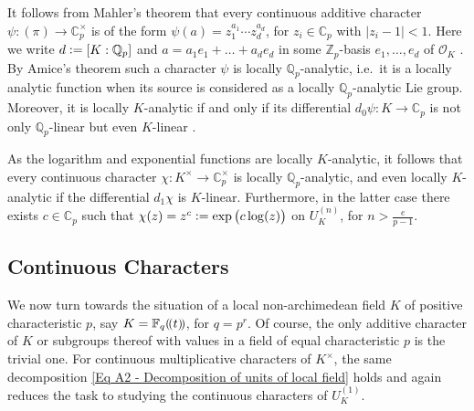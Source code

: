 \documentclass[a4paper, reqno, 10pt]{amsart}
\theoremstyle{definition}
\numberwithin{equation}{section}
\newcommand{\abs}[1]{{\lvert{#1}\rvert}}
\newcommand{\defeq}{\vcentcolon=}
\newcommand{\ra}{\rightarrow}
\newcommand{\unts}{^{\times}}
\newcommand{\llrrparen}[1]{\mkern-3mu\left(\mkern-3mu\left(#1\right)\mkern-3mu\right)}
\newcommand{\BC}{{\mathbb {C}}}
\newcommand{\BF}{{\mathbb {F}}}
\newcommand{\BQ}{{\mathbb {Q}}}
\newcommand{\BZ}{{\mathbb {Z}}}
\newcommand{\CO}{{\mathcal {O}}}
\newcommand{\unif}{{\pi}}
\begin{document}
It follows from Mahler's theorem \cite[Thm.\ 13.1]{SchneiderTeitelbaum04ContLocAnRepThLectHangzhou} that every continuous additive character $\psi \colon (\unif) \ra \BC_p\unts$ is of the form $\psi(a) = z_1^{a_1} \cdots z_d^{a_d}$, for $z_i \in \BC_p$ with $\abs{z_i-1}<1$. 
Here we write $d\defeq[K:\BQ_p]$ and $a=a_1 e_1 +\ldots + a_d e_d$ in some $\BZ_p$-basis $e_1,\ldots,e_d$ of $\CO_K$ \cite[Example 16.2]{SchneiderTeitelbaum04ContLocAnRepThLectHangzhou}.
By Amice's theorem \cite[Thm.\ 13.2]{SchneiderTeitelbaum04ContLocAnRepThLectHangzhou} such a character $\psi$ is locally $\BQ_p$-analytic, i.e.\ it is a locally analytic function when its source is considered as a locally $\BQ_p$-analytic Lie group.
Moreover, it is locally $K$-analytic if and only if its differential $d_0\psi \colon K \ra \BC_p$ is not only $\BQ_p$-linear but even $K$-linear \cite[Prop.\ 16.3]{SchneiderTeitelbaum04ContLocAnRepThLectHangzhou}.

As the logarithm and exponential functions are locally $K$-analytic, it follows that every continuous character $\chi \colon K\unts \ra \BC_p\unts$ is locally $\BQ_p$-analytic, and even locally $K$-analytic if the differential $d_1\chi$ is $K$-linear.
Furthermore, in the latter case there exists $c\in \BC_p$ such that $\chi(z) = z^c \defeq \exp \big(c \log(z) \big)$ on $U^{(n)}_K$, for $n > \frac{e}{p-1}$.


\subsection{Continuous Characters}

We now turn towards the situation of a local non-archime\-de\-an field $K$ of positive characteristic $p$, say $K= \BF_q \llrrparen{t}$, for $q = p^r$.
Of course, the only additive character of $K$ or subgroups thereof with values in a field of equal characteristic $p$ is the trivial one.
For continuous multiplicative characters of $K\unts$, the same decomposition \eqref{Eq A2 - Decomposition of units of local field} holds and again reduces the task to studying the continuous characters of $U^{(1)}_K$.
\end{document}
